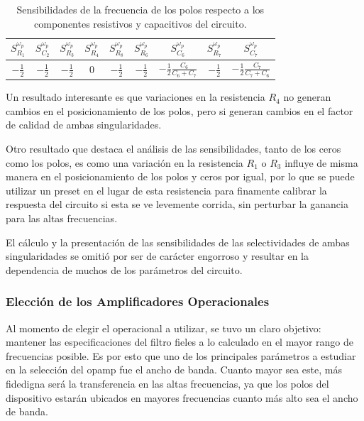 \begin{table}[H]
\centering
\begin{tabular}{@{}ccccccccc@{}}
\toprule
$S^{\omega_p}_{R_1}$ & $S^{\omega_p}_{C_2}$ & $S^{\omega_p}_{R_3}$ & $S^{\omega_p}_{R_4}$ & $S^{\omega_p}_{R_8}$ & $S^{\omega_p}_{R_6}$ & $S^{\omega_p}_{C_6}$ & $S^{\omega_p}_{R_7}$ & $S^{\omega_p}_{C_7}$  \\ \midrule
$-\frac{1}{2}$ & $-\frac{1}{2}$ & $-\frac{1}{2}$ & $0$ & $-\frac{1}{2}$ & $-\frac{1}{2}$ & $-\frac{1}{2}\frac{C_6}{C_6+C_7}$ & $-\frac{1}{2}$ & $-\frac{1}{2} \frac{C_7}{C_7+ C_6}$ \\ \bottomrule
\end{tabular}
\caption{Sensibilidades de la frecuencia de los polos respecto a los componentes resistivos y capacitivos del circuito.}
\label{tab:sens_wp}
\end{table}

Un resultado interesante es que variaciones en la resistencia $R_4$ no generan cambios en el posicionamiento de los polos, pero si generan cambios en el factor de calidad de ambas singularidades.

Otro resultado que destaca el análisis de las sensibilidades, tanto de los ceros como los polos, es como una variación en la resistencia $R_1$ o $R_3$ influye de misma manera en el posicionamiento de los polos y ceros por igual, por lo que se puede utilizar un preset en el lugar de esta resistencia para finamente calibrar la respuesta del circuito si esta se ve levemente corrida, sin perturbar la ganancia para las altas frecuencias.


El cálculo y la presentación de las sensibilidades de las selectividades de ambas singularidades se omitió por ser de carácter engorroso y resultar en la dependencia de muchos de los parámetros del circuito.

\subsubsection{Elección de los Amplificadores Operacionales}

Al momento de elegir el operacional a utilizar, se tuvo un claro objetivo: mantener las especificaciones del filtro fieles a lo calculado en el mayor rango de frecuencias posible. Es por esto que uno de los principales parámetros a estudiar en la selección del opamp fue el ancho de banda. Cuanto mayor sea este, más fidedigna será la transferencia en las altas frecuencias, ya que los polos del dispositivo estarán ubicados en mayores frecuencias cuanto más alto sea el ancho de banda.

